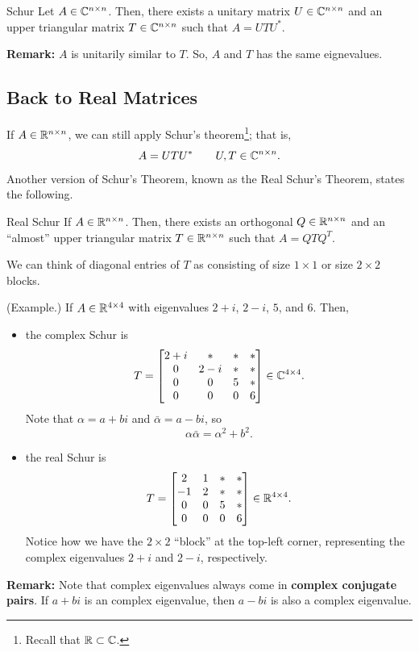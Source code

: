 \documentclass[letterpaper]{article}
\newcommand{\0}{\mathbf{0}}
\begin{document}
\begin{theorem}{Schur}{}
    Let $A \in \mathbb{C}^{n \times n}$. Then, there exists a unitary matrix $U \in \mathbb{C}^{n \times n}$ and an upper triangular matrix $T \in \mathbb{C}^{n \times n}$ such that $A = UTU^*$.
\end{theorem}
\textbf{Remark:} $A$ is unitarily similar to $T$. So, $A$ and $T$ has the same eignevalues. 

\subsection{Back to Real Matrices}
If $A \in \mathbb{R}^{n \times n}$, we can still apply Schur's theorem\footnote{Recall that $\mathbb{R} \subset \mathbb{C}$.}; that is, \[A = UTU^* \qquad U, T \in \mathbb{C}^{n \times n}.\]
Another version of Schur's Theorem, known as the Real Schur's Theorem, states the following.
\begin{theorem}{Real Schur}{}
    If $A \in \mathbb{R}^{n \times n}$. Then, there exists an orthogonal $Q \in \mathbb{R}^{n \times n}$ and an ``almost'' upper triangular matrix $T \in \mathbb{R}^{n \times n}$ such that $A = QTQ^T$. 
\end{theorem}
We can think of diagonal entries of $T$ as consisting of size $1 \times 1$ or size $2 \times 2$ blocks.

\begin{mdframed}
    (Example.) If $A \in \mathbb{R}^{4 \times 4}$ with eigenvalues $2 + i$, $2 - i$, $5$, and $6$. Then, 
    \begin{itemize}
        \item the complex Schur is 
        \[T = \begin{bmatrix}
            2 + i & * & * & * \\ 
            0 & 2 - i & * & * \\ 
            0 & 0 & 5 & * \\ 
            0 & 0 & 0 & 6
        \end{bmatrix} \in \mathbb{C}^{4 \times 4}.\]
        Note that $\alpha = a + bi$ and $\bar{\alpha} = a - bi$, so \[\alpha \bar{\alpha} = \alpha^2 + b^2.\]

        \item the real Schur is 
        \[T = \begin{bmatrix}
            2 & 1 & * & * \\ 
            -1 & 2 & * & * \\ 
            0 & 0 & 5 & * \\ 
            0 & 0 & 0 & 6
        \end{bmatrix} \in \mathbb{R}^{4 \times 4}.\]
        Notice how we have the $2 \times 2$ ``block'' at the top-left corner, representing the complex eigenvalues $2 + i$ and $2 - i$, respectively. 
    \end{itemize}
\end{mdframed}
\textbf{Remark:} Note that complex eigenvalues always come in \textbf{complex conjugate pairs}. If $a + bi$ is an complex eigenvalue, then $a - bi$ is also a complex eigenvalue. 
\end{document}
